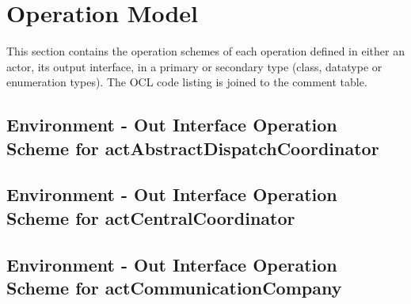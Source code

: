 \chapter{Operation Model}
\label{chap:lu.uni.lassy.excalibur.group09.spec-OM}

This section contains the operation schemes of each operation defined in either an actor, its output interface, in a primary or secondary type (class, datatype or enumeration types). 
The \msrmessir OCL code listing is joined to the comment table.

\lstset{
float,
basicstyle=\scriptsize,
language=Messir,
breakatwhitespace=false,
tabsize=2,
breaklines=true,
numbers=left,
emptylines=1,
numbersep=5pt,
showspaces=false,
showstringspaces=false,
showtabs=false
} 



		
\section{Environment - Out Interface Operation Scheme for actAbstractDispatchCoordinator}
\label{OM-EM-OutInterface-OS-actAbstractDispatchCoordinator}





\section{Environment - Out Interface Operation Scheme for actCentralCoordinator}
\label{OM-EM-OutInterface-OS-actCentralCoordinator}




\section{Environment - Out Interface Operation Scheme for actCommunicationCompany}
\label{OM-EM-OutInterface-OS-actCommunicationCompany}

